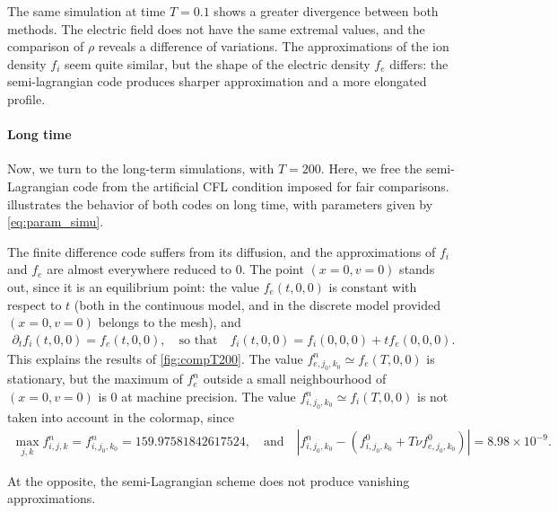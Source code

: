 \documentclass{article}
\numberwithin{equation}{section}
\begin{document}
The same simulation at time $T=0.1$ shows a greater divergence between both methods. The electric field does not have the same extremal values, and the comparison of $\rho$ reveals a difference of variations. The approximations of the ion density $f_i$ seem quite similar, but the shape of the electric density $f_e$ differs: the semi-lagrangian code produces sharper approximation and a more elongated profile.

\paragraph{Long time}

Now, we turn to the long-term simulations, with $T=200$. Here, we free the semi-Lagrangian code from the artificial CFL condition imposed for fair comparisons.  illustrates the behavior of both codes on long time, with parameters given by \cref{eq:param_simu}. 

The finite difference code suffers from its diffusion, and the approximations of $f_i$ and $f_e$ are almost everywhere reduced to 0. The point $(x=0,v=0)$ stands out, since it is an equilibrium point: the value $f_e(t,0,0)$ is constant with respect to $t$ (both in the continuous model, and in the discrete model provided $(x=0,v=0)$ belongs to the mesh), and 
\begin{align*}
	\partial_t f_i (t,0,0) = f_e(t,0,0),  \quad \text{so that} \quad f_i(t,0,0) = f_i(0,0,0) + t f_e(0,0,0).
\end{align*}
This explains the results of \cref{fig:compT200}. The value $f^n_{e,j_0,k_0} \simeq f_e(T,0,0)$ is stationary, but the maximum of $f_e^n$ outside a small neighbourhood of $(x=0,v=0)$ is 0 at machine precision.
The value $f^n_{i,j_0,k_0} \simeq f_i(T,0,0)$ is not taken into account in the colormap, since
\begin{align*}
	\max_{j,k} f^n_{i,j,k} = f^n_{i,j_0,k_0} = 159.97581842617524, \quad \text{and} \quad \left|f^n_{i,j_0,k_0} - (f^0_{i,j_0,k_0} + T \nu f^0_{e,j_0,k_0})\right| = 8.98 \times 10^{-9}.
\end{align*}

At the opposite, the semi-Lagrangian scheme does not produce vanishing approximations. 
\end{document}
